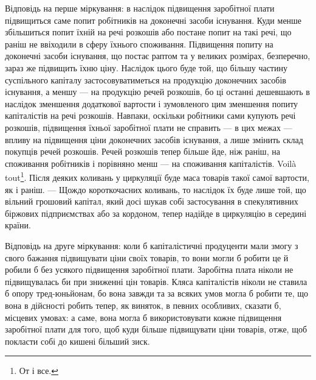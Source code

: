 Відповідь на перше міркування: в наслідок підвищення заробітної
плати підвищиться саме попит робітників на доконечні засоби існування.
Куди менше збільшиться попит їхній на речі розкошів або постане попит
на такі речі, що раніш не ввіходили в сферу їхнього споживання. Підвищення
попиту на доконечні засоби існування, що постає раптом та у
великих розмірах, безперечно, зараз же підвищить їхню ціну. Наслідок
цього буде той, що більшу частину суспільного капіталу застосовуватиметься
на продукцію доконечних засобів існування, а меншу — на продукцію
речей розкошів, бо ці останні дешевшають в наслідок зменшення
додаткової вартости і зумовленого цим зменшення попиту капіталістів на
речі розкошів. Навпаки, оскільки робітники сами купують речі розкошів,
підвищення їхньої заробітної плати не справить — в цих межах — впливу на
підвищення ціни доконечних засобів існування, а лише змінить склад
покупців речей розкошів. Речей розкошів тепер більше йде, ніж раніш,
на споживання робітників і порівняно менш — на споживання капіталістів.
Voilà tout\footnote*{
От і все. 
}. Після деяких коливань у циркуляції буде маса товарів такої
самої вартости, як і раніш. — Щождо короткочасних коливань, то наслідок
їх буде лише той, що вільний грошовий капітал, який досі шукав собі
застосування в спекулятивних біржових підприємствах або за кордоном,
тепер надійде в циркуляцію в середині країни.

Відповідь на друге міркування: коли б капіталістичні продуценти
мали змогу з свого бажання підвищувати ціни своїх товарів, то вони
могли б робити це й робили б без усякого підвищення заробітної плати.
Заробітна плата ніколи не підвищувалась би при зниженні цін товарів.
Кляса капіталістів ніколи не ставила б опору тред-юньйонам, бо вона
завжди та за всяких умов могла б робити те, що вона в дійсності робить
тепер, як виняток, в певних особливих, сказати б, місцевих умовах:
а саме, вона могла б використовувати кожне підвищення заробітної плати
для того, щоб куди більше підвищувати ціни товарів, отже, щоб покласти
собі до кишені більший зиск.

